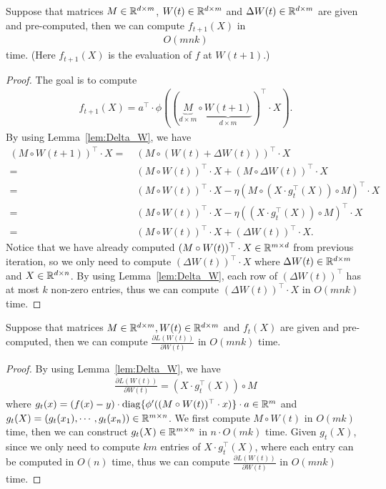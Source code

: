 \begin{lemma}\label{lem:forward_time}
Suppose that matrices $M \in \mathbb{R}^{d \times m}$, $W(t) \in \mathbb{R}^{d \times m}$ and $\Delta W(t) \in \mathbb{R}^{d \times m}$ are given and pre-computed, then we can compute $f_{t+1}(X)$ in
\begin{align*}
    O(mnk)
\end{align*}
time. (Here $f_{t+1}(X)$ is the evaluation of $f$ at $W(t+1)$.)
\end{lemma}
\begin{proof}
    The goal is to compute
    \begin{align*}
      f_{t+1}(X)  = a^\top \cdot \phi( ( \underbrace{ M }_{ d \times m } \circ \underbrace{W(t+1)}_{ d \times m } )^\top \cdot X ).
    \end{align*}
    By using Lemma~\ref{lem:Delta_W}, we have
    \begin{align*}
    (M\circ W(t+1))^\top\cdot X
    = & ~ (M \circ( W(t) + \Delta W(t) ) )^\top \cdot X \\
    = & ~ ( M \circ W(t) )^\top \cdot X + ( M \circ \Delta W(t)  )^\top \cdot X \\
    = & ~ ( M \circ W(t) )^\top \cdot X - \eta (M\circ (X\cdot g^\top_t(X) ) \circ M)^\top \cdot X \\
    = & ~ ( M \circ W(t) )^\top \cdot X - \eta ((X\cdot g^\top_t(X)) \circ M)^\top\cdot X \\
    = & ~ ( M \circ W(t) )^\top \cdot X + (\Delta W(t))^\top\cdot X.
    \end{align*}
    Notice that we have already computed $( M \circ W(t) )^\top \cdot X \in \mathbb{R}^{m \times d}$ from previous iteration, so we only need to compute $(\Delta W(t))^\top\cdot X$ where $\Delta W(t) \in \mathbb{R}^{d\times m}$ and $X\in\mathbb{R}^{d\times n}$. By using Lemma~\ref{lem:Delta_W}, each row of $(\Delta W(t))^\top$ has at most $k$ non-zero entries, thus we can compute $(\Delta W(t))^\top\cdot X$ in $O(mnk)$ time. 
\end{proof}


\begin{lemma}\label{lem:backward_time}
Suppose that matrices $M \in \mathbb{R}^{d \times m}, W(t) \in \mathbb{R}^{d \times m}$ and $f_t(X)$ are given and pre-computed, then we can compute $\frac{\partial L(W(t))}{ \partial W(t)}$ %
in $O(m n k)$ time. 
\end{lemma}
\begin{proof}
By using Lemma~\ref{lem:Delta_W}, we have
\begin{align*}
    \frac{\partial L(W(t))}{ \partial W(t)} = (X\cdot g^\top_t(X))\circ M
\end{align*}
where $g_t(x) = ( f(x) -y )\cdot \mathrm{diag}\{\phi'( (M \circ W(t))^\top\cdot  x)\} \cdot a \in \mathbb{R}^m$ and $g_t(X) = (g_t(x_1), \cdots, g_t(x_n)) \in \mathbb{R}^{m \times n}$. We first compute $M\circ W(t)$ in $O(m k)$ time, then we can construct $g_t(X)\in\mathbb{R}^{m\times n}$ in $n\cdot O(m k)$ time. Given $g_t(X)$, since we only need to compute $km$ entries of $X\cdot g_t^\top(X)$, where each entry can be computed in $O(n)$ time, thus we can compute $\frac{\partial L(W(t))}{ \partial W(t)}$ in $O(m n k)$ time.
\end{proof}


